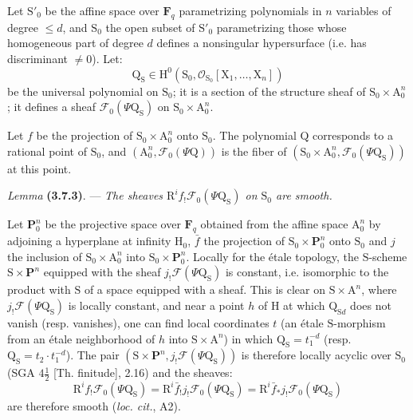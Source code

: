 \documentclass[11pt,leqno]{article}
\begin{document}
Let \(\mathrm S'_0\) be the affine space over \(\mathbf F_q\) parametrizing polynomials in \(n\) variables of degree \(\leq d\), and \(\mathrm S_0\) the open subset of \(\mathrm S'_0\) parametrizing those whose homogeneous part of degree \(d\) defines a nonsingular hypersurface (i.e. has discriminant \(\ne0\)). Let:
\[
\mathrm Q_{\mathrm S}\in
\mathrm H^0(\mathrm S_0,\mathscr O_{\mathrm S_0}[\mathrm X_1,\ldots,\mathrm X_n])
\]
be the universal polynomial on \(\mathrm S_0\); it is a section of the structure sheaf of \(\mathrm S_0\times\mathrm A_0^n\); it defines a sheaf \(\mathscr F_0(\Psi\mathrm Q_{\mathrm S})\) on \(\mathrm S_0\times\mathrm A_0^n\).

Let \(f\) be the projection of \(\mathrm S_0\times\mathrm A_0^n\) onto \(\mathrm S_0\). The polynomial \(\mathrm Q\) corresponds to a rational point of \(\mathrm S_0\), and \((\mathrm A_0^n,\mathscr F_0(\Psi\mathrm Q))\) is the fiber of \((\mathrm S_0\times\mathrm A_0^n,\mathscr F_0(\Psi\mathrm Q_{\mathrm S}))\) at this point.

\textit{Lemma} \textbf{(3.7.3)}. — \textit{The sheaves \(\mathrm R^if_!\mathscr F_0(\Psi\mathrm Q_{\mathrm S})\) on \(\mathrm S_0\) are smooth.}

Let \(\mathbf P_0^n\) be the projective space over \(\mathbf F_q\) obtained from the affine space \(\mathrm A_0^n\) by adjoining a hyperplane at infinity \(\mathrm H_0\), \(\bar f\) the projection of \(\mathrm S_0\times\mathbf P_0^n\) onto \(\mathrm S_0\) and \(j\) the inclusion of \(\mathrm S_0\times\mathrm A_0^n\) into \(\mathrm S_0\times\mathbf P_0^n\). Locally for the étale topology, the \(\mathrm S\)-scheme \(\mathrm S\times\mathbf P^n\) equipped with the sheaf \(j_!\mathscr F(\Psi\mathrm Q_{\mathrm S})\) is constant, i.e. isomorphic to the product with \(\mathrm S\) of a space equipped with a sheaf. This is clear on \(\mathrm S\times\mathrm A^n\), where \(j_!\mathscr F(\Psi\mathrm Q_{\mathrm S})\) is locally constant, and near a point \(h\) of \(\mathrm H\) at which \(\mathrm Q_{\mathrm S d}\) does not vanish (resp. vanishes), one can find local coordinates \(t\) (an étale \(\mathrm S\)-morphism from an étale neighborhood of \(h\) into \(\mathrm S\times\mathrm A^n\)) in which \(\mathrm Q_{\mathrm S}=t_1^{-d}\) (resp. \(\mathrm Q_{\mathrm S}=t_2\cdot t_1^{-d}\)). The pair \((\mathrm S\times\mathbf P^n,j_!\mathscr F(\Psi\mathrm Q_{\mathrm S}))\) is therefore locally acyclic over \(\mathrm S_0\) (SGA \(4\frac{1}{2}\) [Th. finitude], 2.16) and the sheaves:
\[
\mathrm R^if_!\mathscr F_0(\Psi\mathrm Q_{\mathrm S})
=
\mathrm R^i\bar f_!j_!\mathscr F_0(\Psi\mathrm Q_{\mathrm S})
=
\mathrm R^i\bar f_*j_!\mathscr F_0(\Psi\mathrm Q_{\mathrm S})
\]
are therefore smooth (\textit{loc. cit.}, A2).
\end{document}
